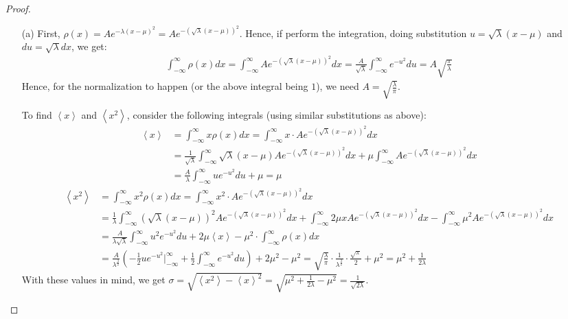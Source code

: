 \documentclass{article}
\begin{document}
\begin{proof}

    \hfil

    \begin{itemize}
        \item[(a)] First, $\rho(x)=A e^{-\lambda(x-\mu)^2} = A e^{-(\sqrt{\lambda}(x-\mu))^2}$. Hence, if perform the integration, doing substitution $u=\sqrt{\lambda}(x-\mu)$ and $du = \sqrt{\lambda} dx$, we get:
        \begin{align}
            \int_{-\infty}^{\infty}\rho(x)dx = \int_{-\infty}^{\infty}A e^{-(\sqrt{\lambda}(x-\mu))^2}dx = \frac{A}{\sqrt{\lambda}}\int_{-\infty}^{\infty}e^{-u^2}du = A\sqrt{\frac{\pi}{\lambda}}
        \end{align}
        Hence, for the normalization to happen (or the above integral being $1$), we need $A=\sqrt{\frac{\lambda}{\pi}}$.

        \hfil

        To find $\left<x\right>$ and $\left<x^2\right>$, consider the following integrals (using similar substitutions as above):
        \begin{align}
            \left<x\right> &= \int_{-\infty}^{\infty}x\rho(x)dx = \int_{-\infty}^{\infty}x \cdot Ae^{-(\sqrt{\lambda}(x-\mu))^2}dx\\
            &= \frac{1}{\sqrt{\lambda}}\int_{-\infty}^{\infty}\sqrt{\lambda}(x-\mu)Ae^{-(\sqrt{\lambda}(x-\mu))^2}dx+\mu\int_{-\infty}^{\infty}A e^{-(\sqrt{\lambda}(x-\mu))^2}dx\\
            &= \frac{A}{\lambda}\int_{-\infty}^{\infty}ue^{-u^2}du + \mu = \mu
        \end{align}
        \begin{align}
            \left<x^2\right>&= \int_{-\infty}^{\infty}x^2\rho(x)dx=\int_{-\infty}^{\infty}x^2\cdot Ae^{-(\sqrt{\lambda}(x-\mu))^2}dx\\ 
            &= \frac{1}{\lambda}\int_{-\infty}^{\infty}(\sqrt{\lambda}(x-\mu))^2 Ae^{-(\sqrt{\lambda}(x-\mu))^2}dx + \int_{-\infty}^{\infty}2\mu x Ae^{-(\sqrt{\lambda}(x-\mu))^2}dx-\int_{-\infty}^{\infty}\mu^2 Ae^{-(\sqrt{\lambda}(x-\mu))^2}dx\\
            &= \frac{A}{\lambda\sqrt{\lambda}}\int_{-\infty}^{\infty}u^2 e^{-u^2}du + 2\mu\left<x\right>-\mu^2\cdot \int_{-\infty}^{\infty}\rho(x)dx\\ 
            &= \frac{A}{\lambda^\frac{3}{2}}\left(-\frac{1}{2}ue^{-u^2}\bigg|_{-\infty}^{\infty}+\frac{1}{2}\int_{-\infty}^{\infty}e^{-u^2}du\right) + 2\mu^2-\mu^2 =\sqrt{\frac{\lambda}{\pi}}\cdot\frac{1}{\lambda^\frac{3}{2}}\cdot\frac{\sqrt{\pi}}{2}+\mu^2 = \mu^2+\frac{1}{2\lambda}
        \end{align}
        With these values in mind, we get $\sigma=\sqrt{\left<x^2\right>-\left<x\right>^2}=\sqrt{\mu^2+\frac{1}{2\lambda}-\mu^2} = \frac{1}{\sqrt{2\lambda}}$.


\end{itemize}
\end{proof}
\end{document}
